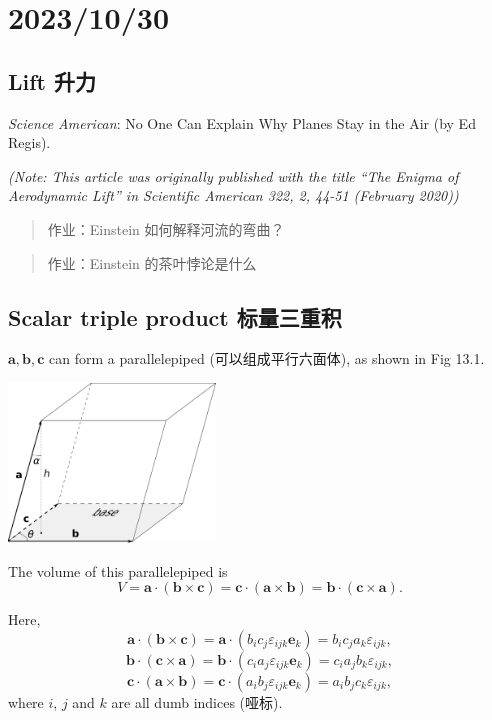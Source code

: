 \chapter{2023/10/30}\label{20231030}

\section{Lift 升力}\label{lift-ux5347ux529b}

\emph{Science American}: No One Can Explain Why Planes Stay in the Air
(by Ed Regis).

\emph{(Note: This article was originally published with the title ``The
Enigma of Aerodynamic Lift'' in Scientific American 322, 2, 44-51
(February 2020))}

\begin{quote}
作业：Einstein 如何解释河流的弯曲？
\end{quote}

\begin{quote}
作业：Einstein 的茶叶悖论是什么
\end{quote}

\section{Scalar triple product
标量三重积}\label{scalar-triple-product-ux6807ux91cfux4e09ux91cdux79ef}

\(\boldsymbol a, \boldsymbol b, \boldsymbol c\) can form a parallelepiped (可以组成平行六面体), as shown in Fig 13.1.

\begin{center}
    \includegraphics[height=120pt]{assets/Scalar_triple_product.png}
\end{center}

The volume of this parallelepiped is
\[V = \boldsymbol a \cdot (\boldsymbol b \times \boldsymbol c) = \boldsymbol c \cdot (\boldsymbol a \times \boldsymbol b) = \boldsymbol b \cdot (\boldsymbol c \times \boldsymbol a).\]

Here,
\[\boldsymbol a \cdot (\boldsymbol b \times \boldsymbol c) = \boldsymbol a \cdot (b_i c_j \varepsilon_{ijk} \boldsymbol e_k) = b_i c_j a_k \varepsilon_{ijk},\]
\[\boldsymbol b \cdot (\boldsymbol c \times \boldsymbol a) = \boldsymbol b \cdot (c_i a_j \varepsilon_{ijk} \boldsymbol e_k) = c_i a_j b_k \varepsilon_{ijk},\]
\[\boldsymbol c \cdot (\boldsymbol a \times \boldsymbol b) = \boldsymbol c \cdot (a_i b_j \varepsilon_{ijk} \boldsymbol e_k) = a_i b_j c_k \varepsilon_{ijk},\]
where \(i\), \(j\) and \(k\) are all dumb indices (哑标).

